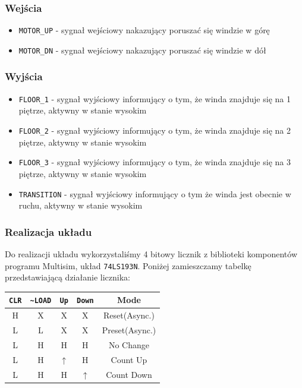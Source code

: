 \documentclass[a4paper]{article}
\begin{document}
\subsubsection{Wejścia}
\begin{itemize}
    \item \verb|MOTOR_UP| - sygnał wejściowy nakazujący poruszać się windzie w górę
    \item \verb|MOTOR_DN| - sygnał wejściowy nakazujący poruszać się windzie w dół
\end{itemize}
\subsubsection{Wyjścia}
\begin{itemize}
    \item \verb|FLOOR_1| - sygnał wyjściowy informujący o tym, że winda znajduje się na 1 piętrze,
                            aktywny w stanie wysokim
    \item \verb|FLOOR_2| - sygnał wyjściowy informujący o tym, że winda znajduje się na 2 piętrze,
                            aktywny w stanie wysokim
    \item \verb|FLOOR_3| - sygnał wyjściowy informujący o tym, że winda znajduje się na 3 piętrze,
                            aktywny w stanie wysokim
    \item \verb|TRANSITION| - sygnał wyjściowy informujący o tym że winda jest obecnie w ruchu,
                            aktywny w stanie wysokim
\end{itemize}
\subsubsection{Realizacja układu}
Do realizacji układu wykorzystaliśmy 4 bitowy licznik z biblioteki komponentów programu Multisim,
układ \verb|74LS193N|. Poniżej zamieszczamy tabelkę przedstawiającą działanie licznika:
\begin{center}
    \begin{tabular}{|c|c|c|c||c|}
        \hline \verb|CLR| & \verb|~LOAD| & \verb|Up| & \verb|Down| & Mode \\
        \hline H & X & X & X & Reset(Async.) \\
        \hline L & L & X & X & Preset(Async.) \\
        \hline L & H & H & H & No Change \\
        \hline L & H & $\uparrow$ & H & Count Up \\
        \hline L & H & H & $\uparrow$ & Count Down \\
        \hline
    \end{tabular}
\end{center}
\end{document}
